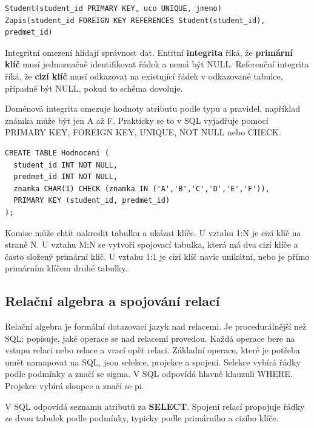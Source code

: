 \documentclass[11pt,a4paper]{article}
\begin{document}
\begin{codebox}
\small
\begin{verbatim}
Student(student_id PRIMARY KEY, uco UNIQUE, jmeno)
Zapis(student_id FOREIGN KEY REFERENCES Student(student_id), predmet_id)
\end{verbatim}
\end{codebox}

Integritní omezení hlídají správnost dat. Entitní \textbf{integrita} říká, že \textbf{primární klíč} musí jednoznačně identifikovat řádek a nemá být NULL. Referenční integrita říká, že \textbf{cizí klíč} musí odkazovat na existující řádek v odkazované tabulce, případně být NULL, pokud to schéma dovoluje.

Doménová integrita omezuje hodnoty atributu podle typu a pravidel, například známka může být jen A až F. Prakticky se to v SQL vyjadřuje pomocí PRIMARY KEY, FOREIGN KEY, UNIQUE, NOT NULL nebo CHECK.

\begin{codebox}
\small
\begin{verbatim}
CREATE TABLE Hodnoceni (
  student_id INT NOT NULL,
  predmet_id INT NOT NULL,
  znamka CHAR(1) CHECK (znamka IN ('A','B','C','D','E','F')),
  PRIMARY KEY (student_id, predmet_id)
);
\end{verbatim}
\end{codebox}

Komise může chtít nakreslit tabulku a ukázat klíče. U vztahu 1:N je cizí klíč na straně N. U vztahu M:N se vytvoří spojovací tabulka, která má dva cizí klíče a často složený primární klíč. U vztahu 1:1 je cizí klíč navíc unikátní, nebo je přímo primárním klíčem druhé tabulky.

\subsection*{Relační algebra a spojování relací}

Relační algebra je formální dotazovací jazyk nad relacemi. Je procedurálnější než SQL: popisuje, jaké operace se nad relacemi provedou. Každá operace bere na vstupu relaci nebo relace a vrací opět relaci. Základní operace, které je potřeba umět namapovat na SQL, jsou selekce, projekce a spojení. Selekce vybírá řádky podle podmínky a značí se sigma. V SQL odpovídá hlavně klauzuli WHERE. Projekce vybírá sloupce a značí se pi.

V SQL odpovídá seznamu atributů za \textbf{SELECT}. Spojení relací propojuje řádky ze dvou tabulek podle podmínky, typicky podle primárního a cizího klíče.
\end{document}
